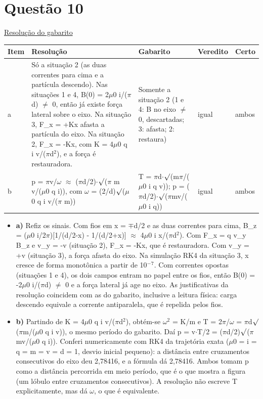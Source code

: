 \documentclass{article}%
\begin{document}
\section*{Questão 10}%
\href{https://poliedroresolve.sistemapoliedro.com.br/vestibulares/ime/2027/ime-2-fase-dia-2-27-10-2026-2-fase-dia-2/dissertativa-10-fisica-2-fase-dia-2-ime-2027}{Resolução do gabarito}\par\smallskip%
\begin{longtable}{@{}p{} p{} p{} p{} p{}@{}}\toprule Item & Resolução & Gabarito & Veredito & Certo \\ \midrule
a & Só a situação 2 (as duas correntes para cima e a partícula descendo). Nas situações 1 e 4, B(0) = 2$\mu$0 i/($\pi$d) $\neq$ 0, então já existe força lateral sobre o eixo. Na situação 3, F\_x = +Kx afasta a partícula do eixo. Na situação 2, F\_x = -Kx, com K = 4$\mu$0 q i v/($\pi$d$^2$), e a força é restauradora. & Somente a situação 2 (1 e 4: B no eixo $\neq$ 0, descartadas; 3: afasta; 2: restaura) & igual & ambos \\
b & p = $\pi$v/$\omega$ $\approx$ ($\pi$d/2)$\cdot$$\surd$($\pi$ m v/($\mu$0 q i)), com $\omega$ = (2/d)$\surd$($\mu$0 q i v/($\pi$ m)) & T = $\pi$d$\cdot$$\surd$(m$\pi$/($\mu$0 i q v)); p = ($\pi$d/2)$\cdot$$\surd$($\pi$mv/($\mu$0 i q)) & igual & ambos \\
\bottomrule\end{longtable}%
\begin{itemize}%
\item%
\textbf{a)} Refiz os sinais. Com fios em x = $\mp$d/2 e as duas correntes para cima, B\_z = ($\mu$0 i/2$\pi$){[}1/(d/2-x) - 1/(d/2+x){]} $\approx$ 4$\mu$0 i x/($\pi$d$^2$). Com F\_x = q v\_y B\_z e v\_y = -v (situação 2), F\_x = -Kx, que é restauradora. Com v\_y = +v (situação 3), a força afasta do eixo. Na simulação RK4 da situação 3, x cresce de forma monotônica a partir de 10$^{-}$$^{7}$. Com correntes opostas (situações 1 e 4), os dois campos entram no papel entre os fios, então B(0) = -2$\mu$0 i/($\pi$d) $\neq$ 0 e a força lateral já age no eixo. As justificativas da resolução coincidem com as do gabarito, inclusive a leitura física: carga descendo equivale a corrente antiparalela, que é repelida pelos fios.%
\item%
\textbf{b)} Partindo de K = 4$\mu$0 q i v/($\pi$d$^2$), obtém{-}se $\omega$$^2$ = K/m e T = 2$\pi$/$\omega$ = $\pi$d$\surd$($\pi$m/($\mu$0 q i v)), o mesmo período do gabarito. Daí p = v$\cdot$T/2 = ($\pi$d/2)$\surd$($\pi$mv/($\mu$0 q i)). Conferi numericamente com RK4 da trajetória exata ($\mu$0 = i = q = m = v = d = 1, desvio inicial pequeno): a distância entre cruzamentos consecutivos do eixo deu 2,78416, e a fórmula dá 2,78416. Ambos tomam p como a distância percorrida em meio período, que é o que mostra a figura (um lóbulo entre cruzamentos consecutivos). A resolução não escreve T explicitamente, mas dá $\omega$, o que é equivalente.%
\end{itemize}%
\end{document}
